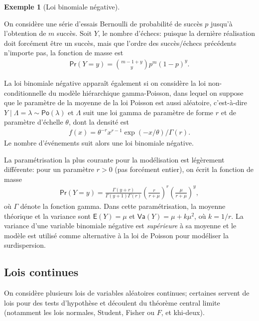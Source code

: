 \documentclass[
  11pt,
  letterpaper,
]{scrbook}
\theoremstyle{definition}
\newtheorem{example}{Exemple}[chapter]
\theoremstyle{definition}
\theoremstyle{remark}
\begin{document}
\begin{example}[Loi binomiale
négative]\protect\hypertarget{exm-loibinneg}{}\label{exm-loibinneg}

On considère une série d'essais Bernoulli de probabilité de succès \(p\)
jusqu'à l'obtention de \(m\) succès. Soit \(Y\), le nombre d'échecs:
puisque la dernière réalisation doit forcément être un succès, mais que
l'ordre des succès/échecs précédents n'importe pas, la fonction de masse
est \begin{align*}
\mathsf{Pr}(Y=y)= \binom{m-1+y}{y} p^m (1-p)^{y}.
\end{align*}

La loi binomiale négative apparaît également si on considère la loi
non-conditionnelle du modèle hiérarchique gamma-Poisson, dans lequel on
suppose que le paramètre de la moyenne de la loi Poisson est aussi
aléatoire, c'est-à-dire
\(Y \mid \Lambda=\lambda \sim \mathsf{Po}(\lambda)\) et \(\Lambda\) suit
une loi gamma de paramètre de forme \(r\) et de paramètre d'échelle
\(\theta\), dont la densité est
\begin{align*} f(x) = \theta^{-r}x^{r-1}\exp(-x/\theta)/\Gamma(r).\end{align*}
Le nombre d'événements suit alors une loi binomiale négative.

La paramétrisation la plus courante pour la modélisation est légèrement
différente: pour un paramètre \(r>0\) (pas forcément entier), on écrit
la fonction de masse \begin{align*}
\mathsf{Pr}(Y=y)=\frac{\Gamma(y+r)}{\Gamma(y+1)\Gamma(r)} \left(\frac{r}{r + \mu} \right)^{r} \left(\frac{\mu}{r+\mu}\right)^y,
\end{align*} où \(\Gamma\) dénote la fonction gamma. Dans cette
paramétrisation, la moyenne théorique et la variance sont
\(\mathsf{E}(Y)=\mu\) et \(\mathsf{Va}(Y)=\mu+k\mu^2\), où \(k=1/r\). La
variance d'une variable binomiale négative est \emph{supérieure} à sa
moyenne et le modèle est utilisé comme alternative à la loi de Poisson
pour modéliser la surdispersion.

\end{example}

\subsection{Lois continues}\label{lois-continues}

On considère plusieurs lois de variables aléatoires continues; certaines
servent de lois pour des tests d'hypothèse et découlent du théorème
central limite (notamment les lois normales, Student, Fisher ou \(F\),
et khi-deux).
\end{document}
